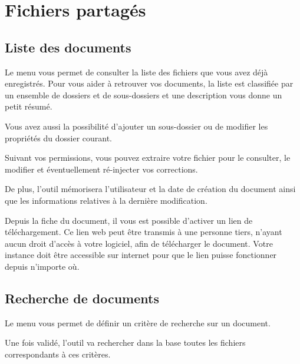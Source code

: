 \documentclass[letterpaper,10pt,french]{sphinxmanual}
\begin{document}
\section{Fichiers partagés}
\label{\detokenize{documents/shared_document:fichiers-partages}}\label{\detokenize{documents/shared_document::doc}}

\subsection{Liste des documents}
\label{\detokenize{documents/shared_document:liste-des-documents}}
Le menu  vous permet de consulter la liste des fichiers que vous avez déjà enregistrés. Pour vous aider à retrouver vos documents, la liste est classifiée par un ensemble de dossiers et de sous-dossiers et une description vous donne un petit résumé.

Vous avez aussi la possibilité d’ajouter un sous-dossier ou de modifier les propriétés du dossier courant.

\noindent{}

Suivant vos permissions, vous pouvez extraire votre fichier pour le consulter, le modifier et éventuellement ré-injecter vos corrections.

De plus, l’outil mémorisera l’utilisateur et la date de création du document ainsi que les informations relatives à la dernière modification.

\noindent{}

Depuis la fiche du document, il vous est possible d’activer un lien de téléchargement.
Ce lien web peut être transmis à une personne tiers, n’ayant aucun droit d’accès à votre logiciel, afin de télécharger le document.
 Votre instance doit être accessible sur internet pour que le lien puisse fonctionner depuis n’importe où.


\subsection{Recherche de documents}
\label{\detokenize{documents/shared_document:recherche-de-documents}}
Le menu  vous permet de définir un critère de recherche sur un document.

Une fois validé, l’outil va rechercher dans la base toutes les fichiers correspondants à ces critères.
\end{document}
